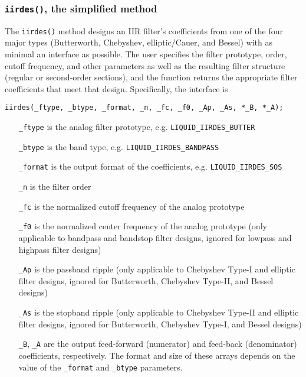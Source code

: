 \subsubsection{{\tt iirdes()}, the simplified method}
\label{module:filter:iirdes:iirdes}
The {\tt iirdes()} method designs an IIR filter's coefficients
from one of the four major types
(Butterworth, Chebyshev, elliptic/Cauer, and Bessel)
with as minimal an interface as possible.
The user specifies the filter prototype, order, cutoff frequency, and
other parameters as well as the resulting filter structure
(regular or second-order sections),
and the function returns the appropriate filter coefficients that meet
that design.
Specifically, the interface is
%
\begin{Verbatim}[fontsize=\small]
    iirdes(_ftype, _btype, _format, _n, _fc, _f0, _Ap, _As, *_B, *_A);
\end{Verbatim}
%
\begin{itemize}
\item[{\tt \_ftype}]
    is the analog filter prototype, e.g. {\tt LIQUID\_IIRDES\_BUTTER}
\item[{\tt \_btype}]
    is the band type, e.g. {\tt LIQUID\_IIRDES\_BANDPASS}
\item[{\tt \_format}]
    is the output format of the coefficients, e.g. {\tt LIQUID\_IIRDES\_SOS}
\item[{\tt \_n}]
    is the filter order
\item[{\tt \_fc}]
    is the normalized cutoff frequency of the analog prototype
\item[{\tt \_f0}]
    is the normalized center frequency of the analog prototype (only
    applicable to bandpass and bandstop filter designs, ignored for lowpass
    and highpass filter designs)
\item[{\tt \_Ap}]
    is the passband ripple (only applicable to Chebyshev Type-I and elliptic
    filter designs, ignored for Butterworth, Chebyshev Type-II, and Bessel
    designs)
\item[{\tt \_As}]
    is the stopband ripple (only applicable to Chebyshev Type-II and elliptic
    filter designs, ignored for Butterworth, Chebyshev Type-I, and Bessel
    designs)
\item[{\tt \_B}, {\tt \_A}]
    are the output feed-forward (numerator) and feed-back (denominator)
    coefficients, respectively.
    The format and size of these arrays depends on the value of the
    {\tt \_format} and {\tt \_btype} parameters.
\end{itemize}

